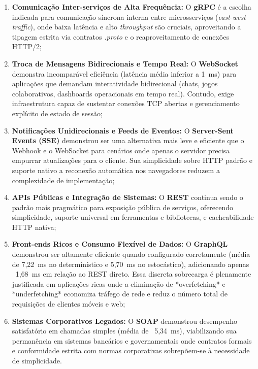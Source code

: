\documentclass[a4paper,12pt]{article}
\begin{document}
\begin{enumerate}
    \item \textbf{Comunicação Inter-serviços de Alta Frequência:} O \textbf{gRPC} é a escolha indicada para comunicação síncrona interna entre microsserviços (\textit{east-west traffic}), onde baixa latência e alto \textit{throughput} são cruciais, aproveitando a tipagem estrita via contratos \textit{.proto} e o reaproveitamento de conexões HTTP/2;
    \item \textbf{Troca de Mensagens Bidirecionais e Tempo Real:} O \textbf{WebSocket} demonstra incomparável eficiência (latência média inferior a 1~ms) para aplicações que demandam interatividade bidirecional (chats, jogos colaborativos, dashboards operacionais em tempo real). Contudo, exige infraestrutura capaz de sustentar conexões TCP abertas e gerenciamento explícito de estado de sessão;
    \item \textbf{Notificações Unidirecionais e Feeds de Eventos:} O \textbf{Server-Sent Events (SSE)} demonstrou ser uma alternativa mais leve e eficiente que o Webhook e o WebSocket para cenários onde apenas o servidor precisa empurrar atualizações para o cliente. Sua simplicidade sobre HTTP padrão e suporte nativo a reconexão automática nos navegadores reduzem a complexidade de implementação;
    \item \textbf{APIs Públicas e Integração de Sistemas:} O \textbf{REST} continua sendo o padrão mais pragmático para exposição pública de serviços, oferecendo simplicidade, suporte universal em ferramentas e bibliotecas, e cacheabilidade HTTP nativa;
    \item \textbf{Front-ends Ricos e Consumo Flexível de Dados:} O \textbf{GraphQL} demonstrou ser altamente eficiente quando configurado corretamente (média de 7,22~ms no determinístico e 5,70~ms no estocástico), adicionando apenas ~1,68~ms em relação ao REST direto. Essa discreta sobrecarga é plenamente justificada em aplicações ricas onde a eliminação de *overfetching* e *underfetching* economiza tráfego de rede e reduz o número total de requisições de clientes móveis e web;
    \item \textbf{Sistemas Corporativos Legados:} O \textbf{SOAP} demonstrou desempenho satisfatório em chamadas simples (média de ~5,34~ms), viabilizando sua permanência em sistemas bancários e governamentais onde contratos formais e conformidade estrita com normas corporativas sobrepõem-se à necessidade de simplicidade.
\end{enumerate}
\end{document}
